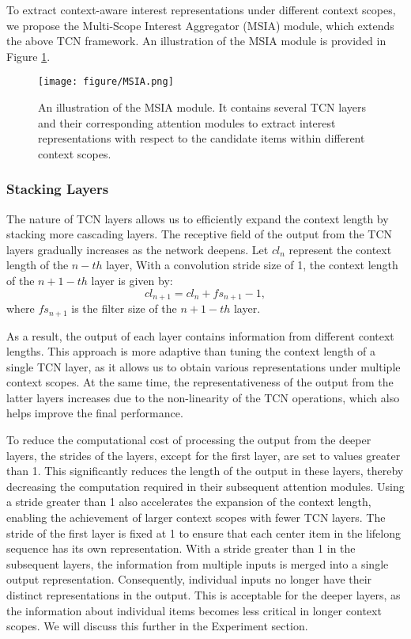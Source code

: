 To extract context-aware interest representations under different context scopes, we propose the Multi-Scope Interest Aggregator (MSIA) module, which extends the above TCN framework. An illustration of the MSIA module is provided in Figure \ref{fig:MSIA}. 

\begin{figure}
    \centering
    \texttt{[image: figure/MSIA.png]}
    \caption{An illustration of the MSIA module. It contains several TCN layers and their corresponding attention modules to extract interest representations with respect to the candidate items within different context scopes. }
    \label{fig:MSIA}
    \vspace{-0.5cm}
\end{figure}

\subsubsection{Stacking Layers}

The nature of TCN layers allows us to efficiently expand the context length by stacking more cascading layers. The receptive field of the output from the TCN layers gradually increases as the network deepens. Let $cl_n$ represent the context length of the $n-th$ layer, With a convolution stride size of 1, the context length of the $n+1-th$ layer is given by:
\begin{equation} 
    cl_{n+1} = cl_n + fs_{n+1} - 1,
\label{eq:receptive}
\end{equation}
where $fs_{n+1}$ is the filter size of the $n+1-th$ layer. 

As a result, the output of each layer contains information from different context lengths. This approach is more adaptive than tuning the context length of a single TCN layer, as it allows us to obtain various representations under multiple context scopes. At the same time, the representativeness of the output from the latter layers increases due to the non-linearity of the TCN operations, which also helps improve the final performance. 

To reduce the computational cost of processing the output from the deeper layers, the strides of the layers, except for the first layer, are set to values greater than 1. This significantly reduces the length of the output in these layers, thereby decreasing the computation required in their subsequent attention modules. Using a stride greater than 1 also accelerates the expansion of the context length, enabling the achievement of larger context scopes with fewer TCN layers. The stride of the first layer is fixed at 1 to ensure that each center item in the lifelong sequence has its own representation. With a stride greater than 1 in the subsequent layers, the information from multiple inputs is merged into a single output representation. Consequently, individual inputs no longer have their distinct representations in the output. This is acceptable for the deeper layers, as the information about individual items becomes less critical in longer context scopes. We will discuss this further in the Experiment section. 

